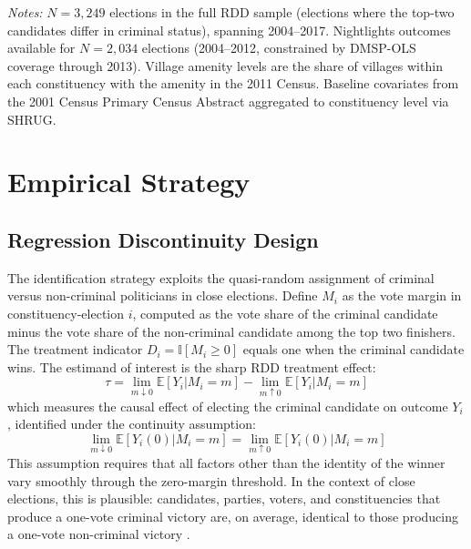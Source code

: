 \documentclass[12pt]{article}
\newcommand{\E}{\mathbb{E}}
\newcommand{\ind}{\mathbb{I}}
\begin{document}
\begin{table}[H]
\begin{threeparttable}
\begin{tablenotes}[flushleft]
\small
\item \textit{Notes:} $N = 3{,}249$ elections in the full RDD sample (elections where the top-two candidates differ in criminal status), spanning 2004--2017. Nightlights outcomes available for $N = 2{,}034$ elections (2004--2012, constrained by DMSP-OLS coverage through 2013). Village amenity levels are the share of villages within each constituency with the amenity in the 2011 Census. Baseline covariates from the 2001 Census Primary Census Abstract aggregated to constituency level via SHRUG.
\end{tablenotes}
\end{threeparttable}
\end{table}


\section{Empirical Strategy}

\subsection{Regression Discontinuity Design}

The identification strategy exploits the quasi-random assignment of criminal versus non-criminal politicians in close elections. Define $M_i$ as the vote margin in constituency-election $i$, computed as the vote share of the criminal candidate minus the vote share of the non-criminal candidate among the top two finishers. The treatment indicator $D_i = \ind[M_i \geq 0]$ equals one when the criminal candidate wins. The estimand of interest is the sharp RDD treatment effect:
\begin{equation}
\tau = \lim_{m \downarrow 0} \E[Y_i | M_i = m] - \lim_{m \uparrow 0} \E[Y_i | M_i = m]
\label{eq:rdd}
\end{equation}
which measures the causal effect of electing the criminal candidate on outcome $Y_i$, identified under the continuity assumption:
\begin{equation}
\lim_{m \downarrow 0} \E[Y_i(0) | M_i = m] = \lim_{m \uparrow 0} \E[Y_i(0) | M_i = m]
\label{eq:continuity}
\end{equation}
This assumption requires that all factors other than the identity of the winner vary smoothly through the zero-margin threshold. In the context of close elections, this is plausible: candidates, parties, voters, and constituencies that produce a one-vote criminal victory are, on average, identical to those producing a one-vote non-criminal victory \citep{lee2008,eggers2015}.
\end{document}
